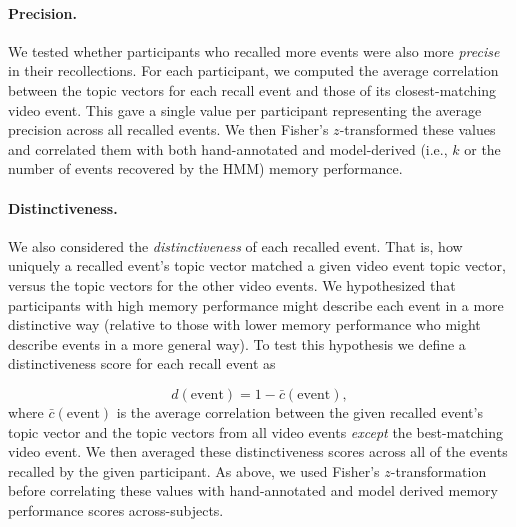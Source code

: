 \documentclass{article}
\begin{document}
\paragraph*{Precision.}
We tested whether participants who recalled more events were also more \textit{precise} in their recollections. For each participant, we computed the average correlation between the topic vectors for each recall event and those of its closest-matching video event. This gave a single value per participant representing the average precision across all recalled events.  We then Fisher's $z$-transformed these values and correlated them with both hand-annotated and model-derived (i.e., $k$ or the number of events recovered by the HMM) memory performance.

\paragraph*{Distinctiveness.}
We also considered the \textit{distinctiveness} of each recalled event. That is, how uniquely a recalled event's topic vector matched a given video event topic vector, versus the topic vectors for the other video events. We hypothesized that participants with high memory performance might describe each event in a more distinctive way (relative to those with lower memory performance who might describe events in a more general way).  To test this hypothesis we define a distinctiveness score for each recall event as

\[
  d(\mathrm{event}) = 1 - \bar{c}(\mathrm{event}),
\]
where $\bar{c}(\mathrm{event})$ is the average correlation between the given recalled event's topic vector and the topic vectors from all video events \textit{except} the best-matching video event.  We then averaged these distinctiveness scores across all of the events recalled by the given participant. As above, we used Fisher's $z$-transformation before correlating these values with hand-annotated and model derived memory performance scores across-subjects.
\end{document}
